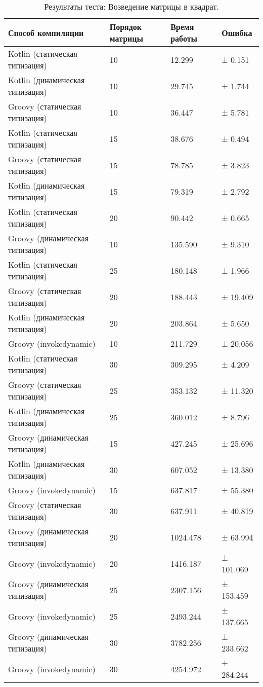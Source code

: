     \begin{table}[h]
\caption{\label{tab:matrixSquareBenchResults}Результаты теста: Возведение матрицы в квадрат.}
\begin{center}
\begin{tabular}{|l|p{}|l|l|}
\hline
Способ компиляции & Порядок матрицы	& Время работы & Ошибка \\
\hline
Kotlin (статическая типизация)     & 10 &   12.299 & ±   0.151\\
Kotlin (динамическая типизация)    & 10 &   29.745 & ±   1.744\\
Groovy (статическая типизация)     & 10 &   36.447 & ±   5.781\\
Kotlin (статическая типизация)     & 15 &   38.676 & ±   0.494\\
Groovy (статическая типизация)     & 15 &   78.785 & ±   3.823\\
Kotlin (динамическая типизация)    & 15 &   79.319 & ±   2.792\\
Kotlin (статическая типизация)     & 20 &   90.442 & ±   0.665\\
Groovy (динамическая типизация)    & 10 &  135.590 & ±   9.310\\
Kotlin (статическая типизация)     & 25 &  180.148 & ±   1.966\\
Groovy (статическая типизация)     & 20 &  188.443 & ±  19.409\\
Kotlin (динамическая типизация)    & 20 &  203.864 & ±   5.650\\
Groovy (invokedynamic)             & 10 &  211.729 & ±  20.056\\
Kotlin (статическая типизация)     & 30 &  309.295 & ±   4.209\\
Groovy (статическая типизация)     & 25 &  353.132 & ±  11.320\\
Kotlin (динамическая типизация)    & 25 &  360.012 & ±   8.796\\
Groovy (динамическая типизация)    & 15 &  427.245 & ±  25.696\\
Kotlin (динамическая типизация)    & 30 &  607.052 & ±  13.380\\
Groovy (invokedynamic)             & 15 &  637.817 & ±  55.380\\
Groovy (статическая типизация)     & 30 &  637.911 & ±  40.819\\
Groovy (динамическая типизация)    & 20 & 1024.478 & ±  63.994\\
Groovy (invokedynamic)             & 20 & 1416.187 & ± 101.069\\
Groovy (динамическая типизация)    & 25 & 2307.156 & ± 153.459\\
Groovy (invokedynamic)             & 25 & 2493.244 & ± 137.665\\
Groovy (динамическая типизация)    & 30 & 3782.256 & ± 233.662\\
Groovy (invokedynamic)             & 30 & 4254.972 & ± 284.244\\
\hline
\end{tabular}
\end{center}
\end{table} 


